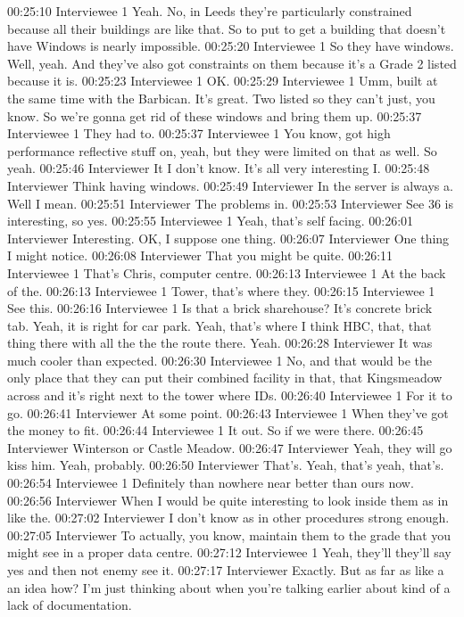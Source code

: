 00:25:10 Interviewee 1
Yeah. No, in Leeds they're particularly constrained because all their buildings are like that. So to put to get a building that doesn't have Windows is nearly impossible.
00:25:20 Interviewee 1
So they have windows. Well, yeah. And they've also got constraints on them because it's a Grade 2 listed because it is.
00:25:23 Interviewee 1
OK.
00:25:29 Interviewee 1
Umm, built at the same time with the Barbican. It's great. Two listed so they can't just, you know. So we're gonna get rid of these windows and bring them up.
00:25:37 Interviewee 1
They had to.
00:25:37 Interviewee 1
You know, got high performance reflective stuff on, yeah, but they were limited on that as well. So yeah.
00:25:46 Interviewer
It I don't know. It's all very interesting I.
00:25:48 Interviewer
Think having windows.
00:25:49 Interviewer
In the server is always a. Well I mean.
00:25:51 Interviewer
The problems in.
00:25:53 Interviewer
See 36 is interesting, so yes.
00:25:55 Interviewee 1
Yeah, that's self facing.
00:26:01 Interviewer
Interesting. OK, I suppose one thing.
00:26:07 Interviewer
One thing I might notice.
00:26:08 Interviewer
That you might be quite.
00:26:11 Interviewee 1
That's Chris, computer centre.
00:26:13 Interviewee 1
At the back of the.
00:26:13 Interviewee 1
Tower, that's where they.
00:26:15 Interviewee 1
See this.
00:26:16 Interviewee 1
Is that a brick sharehouse? It's concrete brick tab. Yeah, it is right for car park. Yeah, that's where I think HBC, that, that thing there with all the the the route there. Yeah.
00:26:28 Interviewer
It was much cooler than expected.
00:26:30 Interviewee 1
No, and that would be the only place that they can put their combined facility in that, that Kingsmeadow across and it's right next to the tower where IDs.
00:26:40 Interviewee 1
For it to go.
00:26:41 Interviewer
At some point.
00:26:43 Interviewee 1
When they've got the money to fit.
00:26:44 Interviewee 1
It out. So if we were there.
00:26:45 Interviewer
Winterson or Castle Meadow.
00:26:47 Interviewer
Yeah, they will go kiss him. Yeah, probably.
00:26:50 Interviewer
That's. Yeah, that's yeah, that's.
00:26:54 Interviewee 1
Definitely than nowhere near better than ours now.
00:26:56 Interviewer
When I would be quite interesting to look inside them as in like the.
00:27:02 Interviewer
I don't know as in other procedures strong enough.
00:27:05 Interviewer
To actually, you know, maintain them to the grade that you might see in a proper data centre.
00:27:12 Interviewee 1
Yeah, they'll they'll say yes and then not enemy see it.
00:27:17 Interviewer
Exactly. But as far as like a an idea how? I'm just thinking about when you're talking earlier about kind of a lack of documentation.
